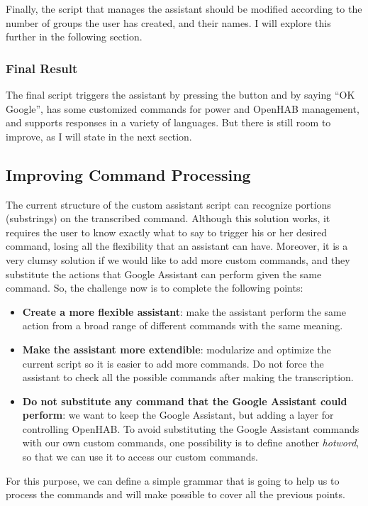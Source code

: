Finally, the script that manages the assistant should be modified according to the number of groups the user has created, and their
names. I will explore this further in the following section.

\subsubsection{Final Result}
The final script triggers the assistant by pressing the button and by saying “OK Google”, has some customized commands for power
and OpenHAB management, and supports responses in a variety of languages. But there is still room to improve, as I will state in the
next section.

\subsection{Improving Command Processing}
The current structure of the custom assistant script can recognize portions (substrings) on the transcribed command. Although this
solution works, it requires the user to know exactly what to say to trigger his or her desired command, losing all the flexibility
that an assistant can have. Moreover, it is a very clumsy solution if we would like to add more custom commands, and they substitute
the actions that Google Assistant can perform given the same command. So, the challenge now is to complete the following points:
\begin{itemize}
	\item \textbf{Create a more flexible assistant}: make the assistant perform the same action from a broad range of different
	commands with the same meaning.
	\item \textbf{Make the assistant more extendible}: modularize and optimize the current script so it is easier to add more commands.
	Do not force the assistant to check all the possible commands after making the transcription.
	\item \textbf{Do not substitute any command that the Google Assistant could perform}: we want to keep the Google Assistant, but
	adding a layer for controlling OpenHAB. To avoid substituting the Google Assistant commands with our own custom commands,
	one possibility is to define another \textit{hotword}, so that we can use it to access our custom commands.
\end{itemize}

For this purpose, we can define a simple grammar that is going to help us to process the commands and will make possible to cover
all the previous points.

